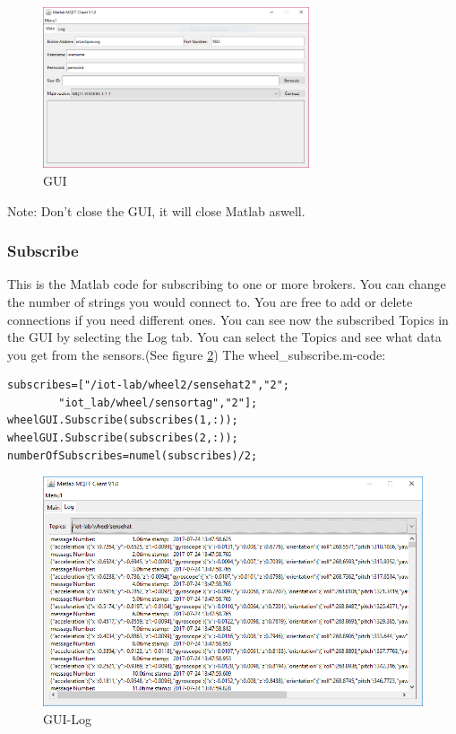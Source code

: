 \documentclass[12pt]{article}
\begin{document}
\begin{figure}[H]
	\centering
	\includegraphics[width=0.7\textwidth]{GUI.PNG}
	\caption{GUI}
	\label{img:GUI.PNG}
\end{figure}
Note: Don't close the GUI, it will close Matlab aswell.

\subsubsection{Subscribe}
This is the Matlab code for subscribing to one or more brokers. 
You can change the number of strings you would connect to. You are free to add or delete connections if you need different ones.
You can see now the subscribed Topics in the GUI by selecting the Log tab. You can select the Topics and see what data you get from the sensors.(See figure \ref{img:GUI-LOG.PNG})\newline
The wheel\_subscribe.m-code:
\lstset{basicstyle=\small,
	breaklines=true,
	language=java,
	showspaces=false,
	showtabs=false}
\begin{lstlisting}
subscribes=["/iot-lab/wheel2/sensehat2","2";
		"iot_lab/wheel/sensortag","2"];
wheelGUI.Subscribe(subscribes(1,:));
wheelGUI.Subscribe(subscribes(2,:));
numberOfSubscribes=numel(subscribes)/2;
\end{lstlisting}
\begin{figure}[H]
	\centering
	\includegraphics[width=1\textwidth]{GUI-LOG.PNG}
	\caption{GUI-Log}
	\label{img:GUI-LOG.PNG}
\end{figure}
\end{document}
